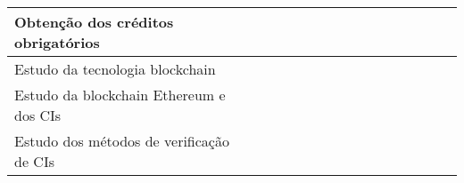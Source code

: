 \begin{table}[!ht]
\begin{tabular}{|l|l|l|l|l|l|l|l|l|l|l|l|l|l|l|l|}
	\hline
	Obtenção dos créditos obrigatórios       & {\cellcolor[rgb]{0.396,0.396,0.396}}  & {\cellcolor[rgb]{0.396,0.396,0.396}}  & {\cellcolor[rgb]{0.396,0.396,0.396}}  & {\cellcolor[rgb]{0.396,0.396,0.396}}  & {\cellcolor[rgb]{0.396,0.396,0.396}}  &                                       &                                       &                                       &                                       &                                       &                                       &                                       &                                       &                                       &                                         \\ 
	\hline
	Estudo da tecnologia blockchain          &                                       &                                       & {\cellcolor[rgb]{0.396,0.396,0.396}}  & {\cellcolor[rgb]{0.396,0.396,0.396}}  & {\cellcolor[rgb]{0.396,0.396,0.396}}  &                                       &                                       &                                       &                                       &                                       &                                       &                                       &                                       &                                       &                                         \\ 
	\hline
	Estudo da blockchain Ethereum e dos CIs  &                                       &                                       & {\cellcolor[rgb]{0.396,0.396,0.396}}  & {\cellcolor[rgb]{0.396,0.396,0.396}}  & {\cellcolor[rgb]{0.396,0.396,0.396}}  & {\cellcolor[rgb]{0.396,0.396,0.396}}  & {\cellcolor[rgb]{0.396,0.396,0.396}}  & {\cellcolor[rgb]{0.396,0.396,0.396}}  & {\cellcolor[rgb]{0.396,0.396,0.396}}  &                                       &                                       &                                       &                                       &                                       &                                         \\ 
	\hline
	Estudo dos métodos de verificação de CIs &                                       &                                       &                                       & {\cellcolor[rgb]{0.396,0.396,0.396}}  & {\cellcolor[rgb]{0.396,0.396,0.396}}  & {\cellcolor[rgb]{0.396,0.396,0.396}}  & {\cellcolor[rgb]{0.396,0.396,0.396}}  & {\cellcolor[rgb]{0.396,0.396,0.396}}  & {\cellcolor[rgb]{0.396,0.396,0.396}}  &                                       &                                       &                                       &                                       &                                       &                                         \\ 

\end{tabular}
\end{table}
